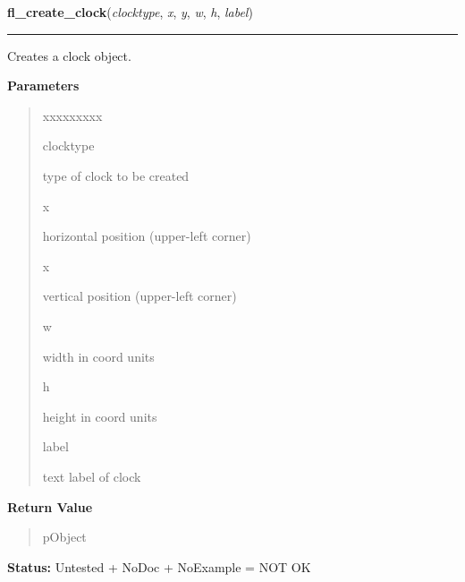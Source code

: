     \label{xformslib:library:fl_create_clock}

    \vspace{0.5ex}

\hspace{.8\funcindent}\begin{boxedminipage}{\funcwidth}

    \raggedright \textbf{fl\_create\_clock}(\textit{clocktype}, \textit{x}, \textit{y}, \textit{w}, \textit{h}, \textit{label})

    \vspace{-1.5ex}

    \rule{\textwidth}{0.5\fboxrule}
\setlength{\parskip}{2ex}
    Creates a clock object.

\setlength{\parskip}{1ex}
      \textbf{Parameters}
      \vspace{-1ex}

      \begin{quote}
        \begin{Ventry}{xxxxxxxxx}

          \item[clocktype]

          type of clock to be created

          \item[x]

          horizontal position (upper-left corner)

          \item[x]

          vertical position (upper-left corner)

          \item[w]

          width in coord units

          \item[h]

          height in coord units

          \item[label]

          text label of clock

        \end{Ventry}

      \end{quote}

      \textbf{Return Value}
    \vspace{-1ex}

      \begin{quote}
      pObject

      \end{quote}

\textbf{Status:} Untested + NoDoc + NoExample = NOT OK



    \end{boxedminipage}

